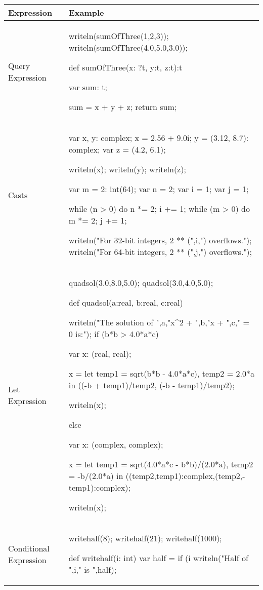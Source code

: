 \begin{center}
\begin{longtable}{|l|l|}
\hline
{\bf Expression} & {\bf Example} \\
\hline
\endhead
\hline
\endfoot
Query Expression &
\begin{chapel} %
writeln(sumOfThree(1,2,3));
writeln(sumOfThree(4.0,5.0,3.0));

def sumOfThree(x: ?t, y:t, z:t):t {
   var sum: t;

   sum = x + y + z;
   return sum;
}
\end{chapel} \\
\hline
Casts &
\begin{chapel} %
var x, y: complex;
x = 2.56 + 9.0i;
y = (3.12, 8.7): complex;
var z = (4.2, 6.1);

writeln(x);
writeln(y);
writeln(z);

var m = 2: int(64);
var n = 2;
var i = 1;
var j = 1;

while (n > 0) do {
  n *= 2;
  i += 1;
}
while (m > 0) do {
  m *= 2;
  j += 1;
}

writeln("For 32-bit integers, 2 ** (",i,") overflows.");
writeln("For 64-bit integers, 2 ** (",j,") overflows.");
\end{chapel} \\
\hline
Let Expression &
\begin{chapel} %
quadsol(3.0,8.0,5.0);
quadsol(3.0,4.0,5.0);

def quadsol(a:real, b:real, c:real) {
  writeln("The solution of ",a,"x^2 + ",b,"x + ",c," = 0 is:");
  if (b*b > 4.0*a*c) {
    var x:  (real, real);

    x = let temp1 = sqrt(b*b - 4.0*a*c), temp2 = 2.0*a in
        ((-b + temp1)/temp2, (-b - temp1)/temp2);

    writeln(x);
  } else {
    var x: (complex, complex);

    x = let temp1 = sqrt(4.0*a*c - b*b)/(2.0*a), temp2 = -b/(2.0*a) in
        ((temp2,temp1):complex,(temp2,-temp1):complex);

    writeln(x);
  }
}
\end{chapel} \\
\hline
Conditional Expression &
\begin{chapel} %
writehalf(8);
writehalf(21);
writehalf(1000);

def writehalf(i: int) {
  var half = if (i %
  writeln("Half of ",i," is ",half);
}
\end{chapel} \\
\hline
\end{longtable}
\end{center}

